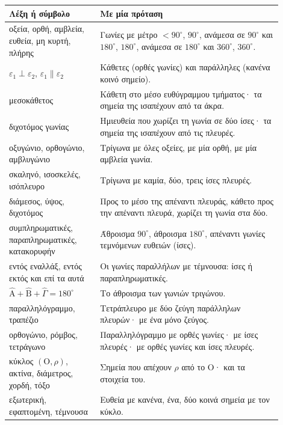

\renewcommand{\arraystretch}{1.5}
\begin{longtable}{@{}>{\raggedright\arraybackslash}p{0.30\linewidth} >{\raggedright\arraybackslash}p{0.60\linewidth}@{}}
\toprule
\textbf{Λέξη ή σύμβολο} & \textbf{Με μία πρόταση}\\
\midrule
\endhead
οξεία, ορθή, αμβλεία, ευθεία, μη κυρτή, πλήρης & Γωνίες με μέτρο $<90^\circ$, $90^\circ$, ανάμεσα σε $90^\circ$ και $180^\circ$, $180^\circ$, ανάμεσα σε $180^\circ$ και $360^\circ$, $360^\circ$.\\
$\varepsilon_1\perp\varepsilon_2$, $\varepsilon_1\parallel\varepsilon_2$ & Κάθετες (ορθές γωνίες) και παράλληλες (κανένα κοινό σημείο).\\
μεσοκάθετος & Κάθετη στο μέσο ευθύγραμμου τμήματος· τα σημεία της ισαπέχουν από τα άκρα.\\
διχοτόμος γωνίας & Ημιευθεία που χωρίζει τη γωνία σε δύο ίσες· τα σημεία της ισαπέχουν από τις πλευρές.\\
οξυγώνιο, ορθογώνιο, αμβλυγώνιο & Τρίγωνα με όλες οξείες, με μία ορθή, με μία αμβλεία γωνία.\\
σκαληνό, ισοσκελές, ισόπλευρο & Τρίγωνα με καμία, δύο, τρεις ίσες πλευρές.\\
διάμεσος, ύψος, διχοτόμος & Προς το μέσο της απέναντι πλευράς, κάθετο προς την απέναντι πλευρά, χωρίζει τη γωνία στα δύο.\\
συμπληρωματικές, παραπληρωματικές, κατακορυφήν & Άθροισμα $90^\circ$, άθροισμα $180^\circ$, απέναντι γωνίες τεμνόμενων ευθειών (ίσες).\\
εντός εναλλάξ, εντός εκτός και επί τα αυτά & Οι γωνίες παραλλήλων με τέμνουσα: ίσες ή παραπληρωματικές.\\
$\hat{\mathrm{Α}}+\hat{\mathrm{Β}}+\hat{\Gamma}=180^\circ$ & Το άθροισμα των γωνιών τριγώνου.\\
παραλληλόγραμμο, τραπέζιο & Τετράπλευρο με δύο ζεύγη παράλληλων πλευρών· με ένα μόνο ζεύγος.\\
ορθογώνιο, ρόμβος, τετράγωνο & Παραλληλόγραμμο με ορθές γωνίες· με ίσες πλευρές· με ορθές γωνίες και ίσες πλευρές.\\
κύκλος $(\mathrm{Ο},\rho)$, ακτίνα, διάμετρος, χορδή, τόξο & Σημεία που απέχουν $\rho$ από το $\mathrm{Ο}$· και τα στοιχεία του.\\
εξωτερική, εφαπτομένη, τέμνουσα & Ευθεία με κανένα, ένα, δύο κοινά σημεία με τον κύκλο.\\
\bottomrule
\end{longtable}

